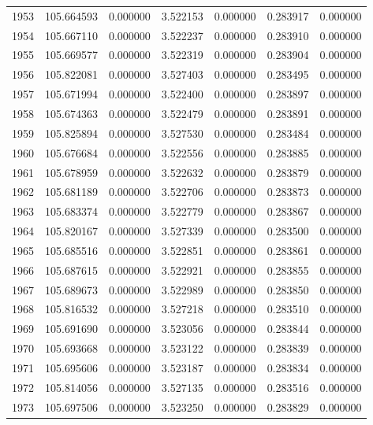 \begin{tabular}{rrrrrrr}
1953 & 105.664593 &    0.000000 &  3.522153 &   0.000000 &   0.283917 &  0.000000 \\
1954 & 105.667110 &    0.000000 &  3.522237 &   0.000000 &   0.283910 &  0.000000 \\
1955 & 105.669577 &    0.000000 &  3.522319 &   0.000000 &   0.283904 &  0.000000 \\
1956 & 105.822081 &    0.000000 &  3.527403 &   0.000000 &   0.283495 &  0.000000 \\
1957 & 105.671994 &    0.000000 &  3.522400 &   0.000000 &   0.283897 &  0.000000 \\
1958 & 105.674363 &    0.000000 &  3.522479 &   0.000000 &   0.283891 &  0.000000 \\
1959 & 105.825894 &    0.000000 &  3.527530 &   0.000000 &   0.283484 &  0.000000 \\
1960 & 105.676684 &    0.000000 &  3.522556 &   0.000000 &   0.283885 &  0.000000 \\
1961 & 105.678959 &    0.000000 &  3.522632 &   0.000000 &   0.283879 &  0.000000 \\
1962 & 105.681189 &    0.000000 &  3.522706 &   0.000000 &   0.283873 &  0.000000 \\
1963 & 105.683374 &    0.000000 &  3.522779 &   0.000000 &   0.283867 &  0.000000 \\
1964 & 105.820167 &    0.000000 &  3.527339 &   0.000000 &   0.283500 &  0.000000 \\
1965 & 105.685516 &    0.000000 &  3.522851 &   0.000000 &   0.283861 &  0.000000 \\
1966 & 105.687615 &    0.000000 &  3.522921 &   0.000000 &   0.283855 &  0.000000 \\
1967 & 105.689673 &    0.000000 &  3.522989 &   0.000000 &   0.283850 &  0.000000 \\
1968 & 105.816532 &    0.000000 &  3.527218 &   0.000000 &   0.283510 &  0.000000 \\
1969 & 105.691690 &    0.000000 &  3.523056 &   0.000000 &   0.283844 &  0.000000 \\
1970 & 105.693668 &    0.000000 &  3.523122 &   0.000000 &   0.283839 &  0.000000 \\
1971 & 105.695606 &    0.000000 &  3.523187 &   0.000000 &   0.283834 &  0.000000 \\
1972 & 105.814056 &    0.000000 &  3.527135 &   0.000000 &   0.283516 &  0.000000 \\
1973 & 105.697506 &    0.000000 &  3.523250 &   0.000000 &   0.283829 &  0.000000 \\

\end{tabular}
